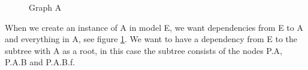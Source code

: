 \documentclass{cslthse-msc}
\begin{document}
\begin{figure}[H]
    \centering
    \qquad
    \subfloat{{}}
    \caption{Graph A}
    \label{fig:GraphA}
\end{figure}

When we create an instance of A in model E, we want dependencies from E to A and everything in A, see figure \ref{fig:GraphA}. We want to have a dependency from E to the subtree with A as a root, in this case the subtree consists of the nodes P.A, P.A.B and P.A.B.f.
\end{document}
